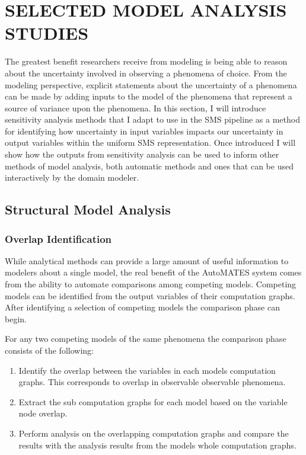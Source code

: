 \chapter{SELECTED MODEL ANALYSIS STUDIES\label{chapter:analysis_studies}}
The greatest benefit researchers receive from modeling is being able to reason about the uncertainty involved in observing a phenomena of choice.
From the modeling perspective, explicit statements about the uncertainty of a phenomena can be made by adding inputs to the model of the phenomena that represent a source of variance upon the phenomena.
In this section, I will introduce sensitivity analysis methods that I adapt to use in the SMS pipeline as a method for identifying how uncertainty in input variables impacts our uncertainty in output variables within the uniform SMS representation.
Once introduced I will show how the outputs from sensitivity analysis can be used to inform other methods of model analysis, both automatic methods and ones that can be used interactively by the domain modeler.

\section{Structural Model Analysis\label{sec:structural_analysis}}

\subsection{Overlap Identification\label{sec:overlap_identification}}
While analytical methods can provide a large amount of useful information to modelers about a single model, the real benefit of the AutoMATES system comes from the ability to automate comparisons among competing models. Competing models can be identified from the output variables of their computation graphs. After identifying a selection of competing models the comparison phase can begin.

For any two competing models of the same phenomena the comparison phase consists of the following:

\begin{enumerate}
  \item Identify the overlap between the variables in each models computation graphs. This corresponds to overlap in observable observable phenomena.
  \item Extract the sub computation graphs for each model based on the variable node overlap.
  \item Perform analysis on the overlapping computation graphs and compare the results with the analysis results from the models whole computation graphs.
\end{enumerate}

